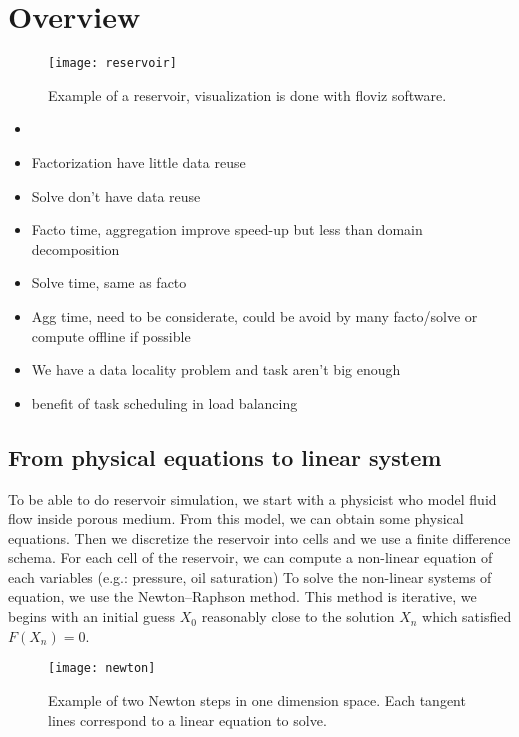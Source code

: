 \section{Overview}

\begin{figure}[!ht]
  \centering
  \texttt{[image: reservoir]}
  \caption{Example of a reservoir, visualization is done with floviz software.}
  \label{floviz}
\end{figure}


\begin{itemize}
  \item
  \item Factorization have little data reuse
  \item Solve don't have data reuse
  \item Facto time, aggregation improve speed-up but less than domain decomposition
  \item Solve time, same as facto
  \item Agg time, need to be considerate, could be avoid by many facto/solve or compute offline if possible
  \item We have a data locality problem and task aren't big enough
  \item benefit of task scheduling in load balancing
\end{itemize}

\subsection{From physical equations to linear system}
To be able to do reservoir simulation, we start with a physicist who model fluid flow inside porous medium.
%
From this model, we can obtain some physical equations.
%
Then we discretize the reservoir into cells and we use a finite difference schema.
%
For each cell of the reservoir, we can compute a non-linear equation of each variables (e.g.: pressure, oil saturation)
%
To solve the non-linear systems of equation, we use the Newton–Raphson method.
%
This method is iterative, we begins with an initial guess $X_0$ reasonably close to the solution $X_n$ which satisfied $F(X_n) = 0$.

\begin{figure}[!ht]
  \centering
  \texttt{[image: newton]}
  \caption{Example of two Newton steps in one dimension space.
    Each tangent lines correspond to a linear equation to solve.}
  \label{newton}
\end{figure}

